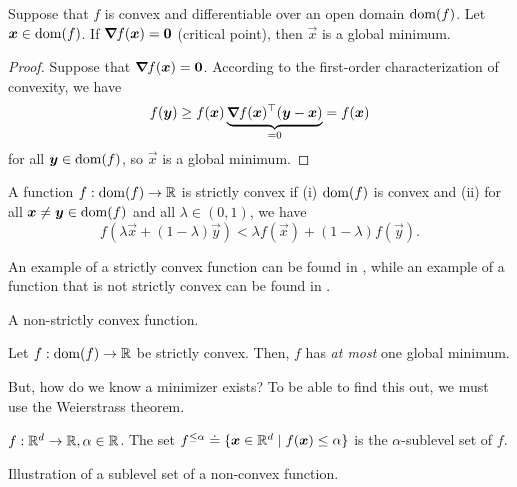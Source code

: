 \begin{lemma}
    Suppose that $f$ is convex and differentiable over an open domain $\mathrm{dom}(f)$. Let $\bm{x}\in\mathrm{dom}(f)$. If $\bm{\nabla}_{\! } f(\bm{x}) = \bm{0}$ (critical point), then $\vec{x}$ is a global minimum.
\end{lemma}

\begin{proof}
    Suppose that $\bm{\nabla}_{\! } f(\bm{x}) = \bm{0}$. According to the first-order characterization of convexity, we have \[
        f(\bm{y}) \geq f(\bm{x}) \underbrace{\bm{\nabla}_{\! } f(\bm{x})^\top (\bm{y}-\bm{x})}_{=0} = f(\bm{x})
    \]
    for all $\bm{y} \in \mathrm{dom}(f)$, so $\vec{x}$ is a global minimum.
\end{proof}

\begin{definition}
    A function $f: \mathrm{dom}(f)\to \mathbb{R}$ is strictly convex if (i) $\mathrm{dom}(f)$ is convex and (ii) for all $\bm{x} \neq \bm{y}\in \mathrm{dom}(f)$ and all $\lambda\in(0,1)$, we have \[
        f(\lambda \vec{x} + (1-\lambda) \vec{y}) < \lambda f(\vec{x}) + (1-\lambda) f(\vec{y}).
    \]
\end{definition}

An example of a strictly convex function can be found in , while an example of a function that is not strictly convex can be found in .

\begin{marginfigure}
    \centering
    \caption{A non-strictly convex function.}
    \label{fig:non-strict-convexity}
\end{marginfigure}

\begin{lemma}
    Let $f: \mathrm{dom}(f) \to \mathbb{R}$ be strictly convex. Then, $f$ has \textit{at most} one global minimum.
\end{lemma}

But, how do we know a minimizer exists? To be able to find this out, we must use the Weierstrass
theorem.

\begin{definition}
    $f: \mathbb{R}^d \to \mathbb{R}, \alpha\in \mathbb{R}$. The set $f^{\leq \alpha} \doteq \{ \bm{x}\in \mathbb{R}^d \mid f(\bm{x}) \leq \alpha \}$ is the $\alpha$-sublevel set of $f$.
\end{definition}

\begin{marginfigure}
    \centering
    \caption{Illustration of a sublevel set of a non-convex function.}
    \label{fig:sublevel-set}
\end{marginfigure}

